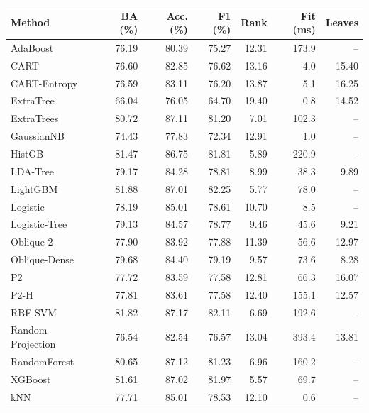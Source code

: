 \begin{tabular}{lrrrrrr}
\toprule
Method & BA (\%) & Acc. (\%) & F1 (\%) & Rank & Fit (ms) & Leaves \\
\midrule
AdaBoost & 76.19 & 80.39 & 75.27 & 12.31 & 173.9 & -- \\
CART & 76.60 & 82.85 & 76.62 & 13.16 & 4.0 & 15.40 \\
CART-Entropy & 76.59 & 83.11 & 76.20 & 13.87 & 5.1 & 16.25 \\
ExtraTree & 66.04 & 76.05 & 64.70 & 19.40 & 0.8 & 14.52 \\
ExtraTrees & 80.72 & 87.11 & 81.20 & 7.01 & 102.3 & -- \\
GaussianNB & 74.43 & 77.83 & 72.34 & 12.91 & 1.0 & -- \\
HistGB & 81.47 & 86.75 & 81.81 & 5.89 & 220.9 & -- \\
LDA-Tree & 79.17 & 84.28 & 78.81 & 8.99 & 38.3 & 9.89 \\
LightGBM & 81.88 & 87.01 & 82.25 & 5.77 & 78.0 & -- \\
Logistic & 78.19 & 85.01 & 78.61 & 10.70 & 8.5 & -- \\
Logistic-Tree & 79.13 & 84.57 & 78.77 & 9.46 & 45.6 & 9.21 \\
Oblique-2 & 77.90 & 83.92 & 77.88 & 11.39 & 56.6 & 12.97 \\
Oblique-Dense & 79.68 & 84.40 & 79.19 & 9.57 & 73.6 & 8.28 \\
P2 & 77.72 & 83.59 & 77.58 & 12.81 & 66.3 & 16.07 \\
P2-H & 77.81 & 83.61 & 77.58 & 12.40 & 155.1 & 12.57 \\
RBF-SVM & 81.82 & 87.17 & 82.11 & 6.69 & 192.6 & -- \\
Random-Projection & 76.54 & 82.54 & 76.57 & 13.04 & 393.4 & 13.81 \\
RandomForest & 80.65 & 87.12 & 81.23 & 6.96 & 160.2 & -- \\
XGBoost & 81.61 & 87.02 & 81.97 & 5.57 & 69.7 & -- \\
kNN & 77.71 & 85.01 & 78.53 & 12.10 & 0.6 & -- \\
\bottomrule
\end{tabular}
